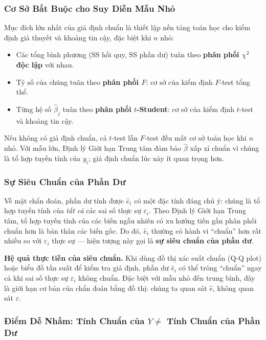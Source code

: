 \documentclass[12pt, a4paper]{article}
\begin{document}
\subsubsection{Cơ Sở Bắt Buộc cho Suy Diễn Mẫu Nhỏ}
\label{sec:normality_theory}

Mục đích lớn nhất của giả định chuẩn là thiết lập nền tảng toán học cho kiểm định giả thuyết và khoảng tin cậy, đặc biệt khi $n$ nhỏ:

\begin{itemize}
  \item Các tổng bình phương (SS hồi quy, SS phần dư) tuân theo \textbf{phân phối $\chi^2$ độc lập} với nhau.
  \item Tỷ số của chúng tuân theo \textbf{phân phối $F$}: cơ sở của kiểm định $F$-test tổng thể.
  \item Từng hệ số $\hat{\beta}_j$ tuân theo \textbf{phân phối $t$-Student}: cơ sở của kiểm định $t$-test và khoảng tin cậy.
\end{itemize}

Nếu không có giả định chuẩn, cả $t$-test lẫn $F$-test đều mất cơ sở toán học khi $n$ nhỏ. Với mẫu lớn, Định lý Giới hạn Trung tâm đảm bảo $\hat{\beta}$ xấp xỉ chuẩn vì chúng là tổ hợp tuyến tính của $y_i$; giả định chuẩn lúc này ít quan trọng hơn.

\subsubsection{Sự Siêu Chuẩn của Phần Dư}

Về mặt chẩn đoán, phần dư tính được $\hat{e}_i$ có một đặc tính đáng chú ý: chúng là tổ hợp tuyến tính của \textit{tất cả} các sai số thực sự $\varepsilon_i$. Theo Định lý Giới hạn Trung tâm, tổ hợp tuyến tính của các biến ngẫu nhiên có xu hướng tiến gần phân phối chuẩn hơn là bản thân các biến gốc. Do đó, $\hat{e}_i$ thường có hành vi ``chuẩn'' hơn rất nhiều so với $\varepsilon_i$ thực sự --- hiện tượng này gọi là \textbf{sự siêu chuẩn của phần dư}.

\textbf{Hệ quả thực tiễn của siêu chuẩn.} Khi dùng đồ thị xác suất chuẩn (Q-Q plot) hoặc biểu đồ tần suất để kiểm tra giả định, phần dư $\hat{e}_i$ có thể trông ``chuẩn'' ngay cả khi sai số thực sự $\varepsilon_i$ không chuẩn. Đặc biệt với mẫu nhỏ đến trung bình, đây là giới hạn cơ bản của chẩn đoán bằng đồ thị: chúng ta quan sát $\hat{e}$, không quan sát $\varepsilon$.

\subsubsection{Điểm Dễ Nhầm: Tính Chuẩn của $Y \neq$ Tính Chuẩn của Phần Dư}
\end{document}
